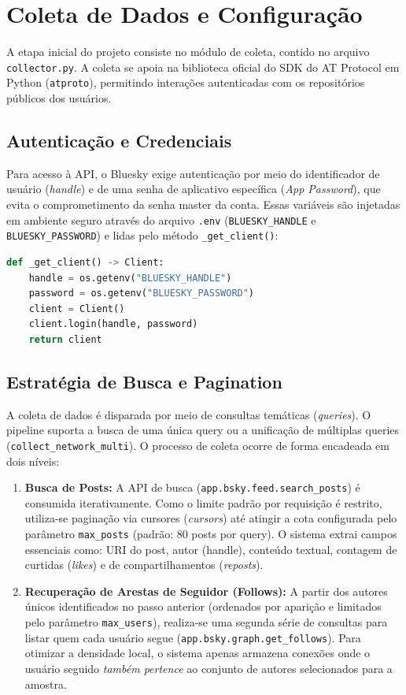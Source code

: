 \documentclass[12pt,a4paper]{article}
\begin{document}
\section{Coleta de Dados e Configuração}
A etapa inicial do projeto consiste no módulo de coleta, contido no arquivo \texttt{collector.py}. A coleta se apoia na biblioteca oficial do SDK do AT Protocol em Python (\texttt{atproto}), permitindo interações autenticadas com os repositórios públicos dos usuários.

\subsection{Autenticação e Credenciais}
Para acesso à API, o Bluesky exige autenticação por meio do identificador de usuário (\textit{handle}) e de uma senha de aplicativo específica (\textit{App Password}), que evita o comprometimento da senha master da conta. Essas variáveis são injetadas em ambiente seguro através do arquivo \texttt{.env} (\texttt{BLUESKY\_HANDLE} e \texttt{BLUESKY\_PASSWORD}) e lidas pelo método \texttt{\_get\_client()}:
\begin{lstlisting}[language=Python]
def _get_client() -> Client:
    handle = os.getenv("BLUESKY_HANDLE")
    password = os.getenv("BLUESKY_PASSWORD")
    client = Client()
    client.login(handle, password)
    return client
\end{lstlisting}

\subsection{Estratégia de Busca e Pagination}
A coleta de dados é disparada por meio de consultas temáticas (\textit{queries}). O pipeline suporta a busca de uma única query ou a unificação de múltiplas queries (\texttt{collect\_network\_multi}). O processo de coleta ocorre de forma encadeada em dois níveis:
\begin{enumerate}
    \item \textbf{Busca de Posts:} A API de busca (\texttt{app.bsky.feed.search\_posts}) é consumida iterativamente. Como o limite padrão por requisição é restrito, utiliza-se paginação via cursores (\textit{cursors}) até atingir a cota configurada pelo parâmetro \texttt{max\_posts} (padrão: 80 posts por query). O sistema extrai campos essenciais como: URI do post, autor (handle), conteúdo textual, contagem de curtidas (\textit{likes}) e de compartilhamentos (\textit{reposts}).
    \item \textbf{Recuperação de Arestas de Seguidor (Follows):} A partir dos autores únicos identificados no passo anterior (ordenados por aparição e limitados pelo parâmetro \texttt{max\_users}), realiza-se uma segunda série de consultas para listar quem cada usuário segue (\texttt{app.bsky.graph.get\_follows}). Para otimizar a densidade local, o sistema apenas armazena conexões onde o usuário seguido \textit{também pertence} ao conjunto de autores selecionados para a amostra.
\end{enumerate}
\end{document}

